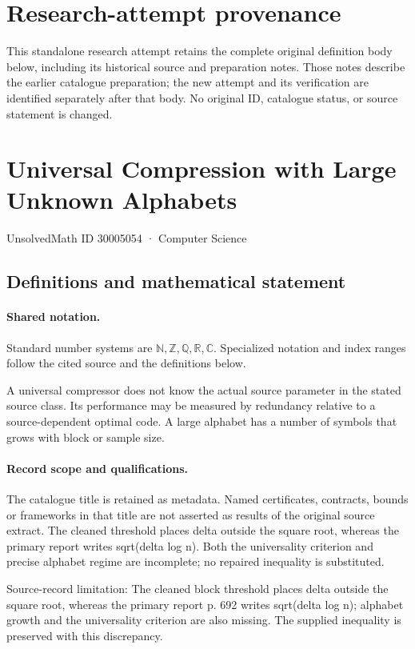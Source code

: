 \documentclass[11pt]{article}
\begin{document}
\section*{Research-attempt provenance}
This standalone research attempt retains the complete original definition body below,
including its historical source and preparation notes. Those notes describe the
earlier catalogue preparation; the new attempt and its verification are identified
separately after that body. No original ID, catalogue status, or source statement is changed.

\section{Universal Compression with Large Unknown Alphabets}\label{30005054}
{\small UnsolvedMath ID 30005054 · Computer Science}
\subsection{Definitions and mathematical statement}

\paragraph{Shared notation.}Standard number systems are $\mathbb N,\mathbb Z,\mathbb Q,\mathbb R,\mathbb C$. Specialized notation and index ranges follow the cited source and the definitions below.


A universal compressor does not know the actual source parameter in the stated source class. Its performance may be measured by redundancy relative to a source-dependent optimal code. A large alphabet has a number of symbols that grows with block or sample size.
\paragraph{Record scope and qualifications.}
The catalogue title is retained as metadata. Named certificates, contracts, bounds or frameworks in that title are not asserted as results of the original source extract.
The cleaned threshold places delta outside the square root, whereas the primary report writes sqrt(delta log n). Both the universality criterion and precise alphabet regime are incomplete; no repaired inequality is substituted.

Source-record limitation: The cleaned block threshold places delta outside the square root, whereas the primary report p. 692 writes sqrt(delta log n); alphabet growth and the universality criterion are also missing. The supplied inequality is preserved with this discrepancy.
\end{document}
